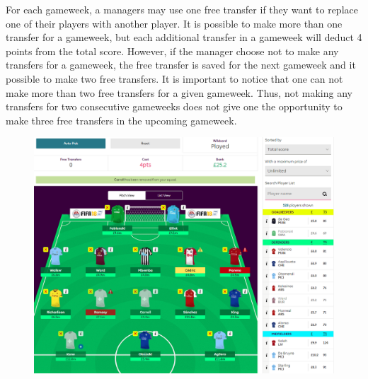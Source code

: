 \newpar

For each gameweek, a managers may use one free transfer if they want to replace one of their players with another player. It is possible to make more than one transfer for a gameweek, but each additional transfer in a gameweek will deduct 4 points from the total score. However, if the manager choose not to make any transfers for a gameweek, the free transfer is saved for the next gameweek and it possible to make two free transfers. It is important to notice that one can not make more than two free transfers for a given gameweek. Thus, not making any transfers for two consecutive gameweeks does not give one the opportunity to make three free transfers in the upcoming gameweek. 


\begin{figure}[H]
\centering
\includegraphics[scale=0.35]{fig/fantasyteam1.png}
\label{Figure_2.1}
\label{fig:fantasy_bilde}
\end{figure}

